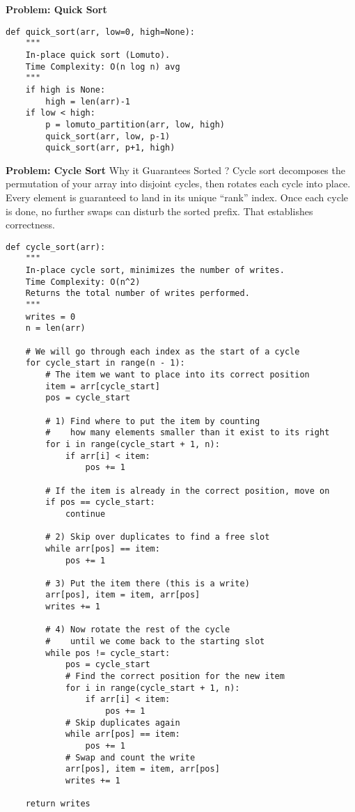 \noindent\textbf{Problem: Quick Sort}
\begin{verbatim}
def quick_sort(arr, low=0, high=None):
    """
    In-place quick sort (Lomuto).
    Time Complexity: O(n log n) avg
    """
    if high is None:
        high = len(arr)-1
    if low < high:
        p = lomuto_partition(arr, low, high)
        quick_sort(arr, low, p-1)
        quick_sort(arr, p+1, high)
\end{verbatim}

\noindent\textbf{Problem: Cycle Sort}
Why it Guarantees Sorted ?  Cycle sort decomposes the permutation of your array into disjoint cycles, then rotates each cycle into place. Every element is guaranteed to land in its unique “rank” index. Once each cycle is done, no further swaps can disturb the sorted prefix. That establishes correctness.
\begin{verbatim}
def cycle_sort(arr):
    """
    In-place cycle sort, minimizes the number of writes.
    Time Complexity: O(n^2)
    Returns the total number of writes performed.
    """
    writes = 0
    n = len(arr)

    # We will go through each index as the start of a cycle
    for cycle_start in range(n - 1):
        # The item we want to place into its correct position
        item = arr[cycle_start]
        pos = cycle_start

        # 1) Find where to put the item by counting
        #    how many elements smaller than it exist to its right
        for i in range(cycle_start + 1, n):
            if arr[i] < item:
                pos += 1

        # If the item is already in the correct position, move on
        if pos == cycle_start:
            continue

        # 2) Skip over duplicates to find a free slot
        while arr[pos] == item:
            pos += 1

        # 3) Put the item there (this is a write)
        arr[pos], item = item, arr[pos]
        writes += 1

        # 4) Now rotate the rest of the cycle
        #    until we come back to the starting slot
        while pos != cycle_start:
            pos = cycle_start
            # Find the correct position for the new item
            for i in range(cycle_start + 1, n):
                if arr[i] < item:
                    pos += 1
            # Skip duplicates again
            while arr[pos] == item:
                pos += 1
            # Swap and count the write
            arr[pos], item = item, arr[pos]
            writes += 1

    return writes
\end{verbatim}

